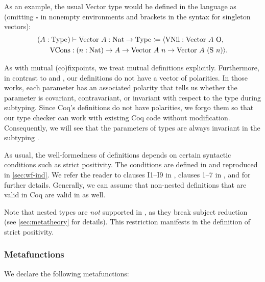 As an example, the usual Vector type would be defined in the language as (omitting $\square$ in nonempty environments and brackets in the syntax for singleton vectors):
\begin{align*}
    (A : \text{Type}_{}) &\vdash \text{Vector} ~ A: \text{Nat} \to \text{Type}_{} \coloneqq
        \langle \text{VNil} : \text{Vector} ~ A ~ \text{O}, \\
        \text{VCons} &: (n: \text{Nat}) \to A \to \text{Vector} ~ A ~ n \to \text{Vector} ~ A ~ (\text{S} ~ n) \rangle.
\end{align*}

As with mutual (co)\-fixpoints, we treat mutual \coinductive definitions explicitly.
Furthermore, in contrast to \CIChat and \CIChatminus, our definitions do not have a vector of polarities.
In those works, each parameter has an associated polarity that tells us whether the parameter is covariant, contravariant, or invariant with respect to the \coinductive type during subtyping.
Since Coq's \coinductive definitions do not have polarities, we forgo them so that our type checker can work with existing Coq code without modification.
Consequently, we will see that the parameters of \coinductive types are always invariant in the subtyping .

As usual, the well-formedness of \coinductive definitions depends on certain syntactic conditions such as strict positivity.
The conditions are defined in \anotherpdf and reproduced in \autoref{sec:wf-ind}.
We refer the reader to clauses I1--I9 in \citet{cic-hat-minus}, clauses 1--7 in \mbox{\citet{cic-hat}}, and \citet{coq} for further details.
Generally, we can assume that non-nested \coinductive definitions that are valid in Coq are valid in \lang as well.

Note that nested \coinductive types are \emph{not} supported in \lang, as they break subject reduction (see \autoref{sec:metatheory} for details).
This restriction manifests in the definition of strict positivity.

\subsubsection{Metafunctions}

We declare the following metafunctions:

